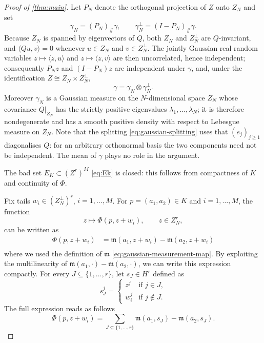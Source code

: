 \documentclass[11pt,oneside]{amsart}
\theoremstyle{plain}
\theoremstyle{definition}
\theoremstyle{remark}
\newcommand{\restr}[2]{\left.#1\right|_{#2}}
\begin{document}
\begin{proof}[Proof of \cref{thm:main}]
Let $P_N$ denote the orthogonal projection of $Z$ onto $Z_N$ and set
\[
    \gamma_N=(P_N)_\#\gamma,
    \qquad
    \gamma_N^\perp=(I-P_N)_\#\gamma .
\]
Because $Z_N$ is spanned by eigenvectors of $Q$, both $Z_N$ and $Z_N^\perp$ are
$Q$-invariant, and $\langle Qu,v\rangle=0$ whenever $u\in Z_N$ and $v\in Z_N^\perp$. The
jointly Gaussian real random variables $z\mapsto\langle z,u\rangle$ and
$z\mapsto\langle z,v\rangle$ are then uncorrelated, hence independent; consequently $P_Nz$
and $(I-P_N)z$ are independent under $\gamma$, and, under the identification
$Z\cong Z_N\times Z_N^\perp$,
\begin{equation}\label{eq:gaussian-splitting}
    \gamma=\gamma_N\otimes\gamma_N^\perp .
\end{equation}
Moreover $\gamma_N$ is a Gaussian measure on the $N$-dimensional space $Z_N$ whose
covariance $\restr{Q}{Z_N}$ has the strictly positive eigenvalues
$\lambda_1,\ldots,\lambda_N$; it is therefore nondegenerate and has a smooth positive
density with respect to Lebesgue measure on $Z_N$. Note that the splitting
\eqref{eq:gaussian-splitting} uses that $(e_j)_{j\geq1}$ diagonalises $Q$: for an arbitrary
orthonormal basis the two components need not be independent. The mean of $\gamma$ plays no
role in the argument.

The bad set $E_K\subset(Z^r)^M$ \eqref{eq:Ek} is closed: this follows from compactness of $K$ and continuity of $\Phi$.

Fix tails $w_i\in(Z_N^\perp)^r$, $i=1,\ldots,M$. For $p=(a_1,a_2)\in K$ and $i=1,\dots,M$, the function
\[
    z\longmapsto\Phi(p,z+w_i),\qquad z\in Z_N^r,
\]
can be written as
\begin{align*}
    \Phi(p,z+w_i)
    &=\mathfrak{m}(a_1,z+w_i)-\mathfrak{m}(a_2,z+w_i)\\
\end{align*}
where we used the definition of $\mathfrak m$ \eqref{eq:gaussian-measurement-map}. By exploiting the multilinearity of $\mathfrak m(a_1,\cdot)-\mathfrak m(a_2,\cdot)$, we can write this expression compactly. For every $J\subseteq\{1,\dots,r\}$, let $s_J\in H^r$ defined as
\[
    s_J^j = 
    \begin{cases} 
         z^j  & \text{if } j \in J, \\ 
         w_i^j & \text{if } j \notin J. 
    \end{cases}
\]
The full expression reads as follows
\[  
    \Phi(p,z+w_i)=\sum_{J\subseteq\{1,\dots,r\}}\mathfrak m(a_1,s_J)-\mathfrak m(a_2,s_J).
\]


\end{proof}
\end{document}
